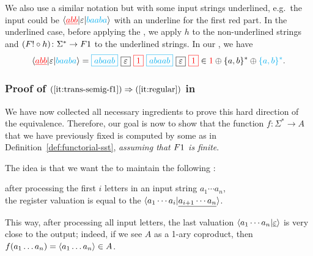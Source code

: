 We also use a similar notation but with some input strings underlined, e.g.~the input could be $\langle {\color{red}\underline{abb}} | \varepsilon | {\color{cyan}baaba} \rangle$ with an underline for the first red part. In the underlined case, before applying the , we apply $h$ to the non-underlined strings and
$(\functor! \circ h) \colon \Sigma^* \to \functor1$
to the underlined strings. In our , we have
\begin{align*}
  \tuple{\red{\underline{abb}} | \varepsilon | \blue{baaba}} =  
  \blue{\boxed{abaab}} \ 
  \boxed{\varepsilon} \ 
  \red{\boxed{1}} \ 
  \blue{\boxed{abaab}} \
  \boxed{\varepsilon} \
  \red{\boxed{1}}
  \in \red{1} \oplus \set{a,b}^*  \oplus \blue{\set{a,b}^*}.
\end{align*}

\subsubsection{Proof of $(\ref{it:trans-semig-f1}) \Rightarrow (\ref{it:regular})$ in }
We have now collected all necessary ingredients to prove this hard direction of
the equivalence. Therefore, our goal is now to show that the function $f\colon
\Sigma^* \to A$ that we have previously fixed is computed by some  as in Definition~\ref{def:functorial-sst},
\emph{assuming that $\functor 1$ is finite}.

The idea is that we want the \functorialsst to maintain the following : 
\begin{center}
  after processing the first $i$ letters in an input string $a_1 \cdots a_n$,\\ the register valuation is equal to the \kl{factorized output} $\langle a_1 \cdots a_i | \underline{a_{i+1} \cdots a_n} \rangle$.
\end{center}
 This way, after processing all input letters, the last valuation $\langle a_1 \cdots a_n | \underline{\varepsilon} \rangle$ is very close to the output; indeed, if we see $A$ as a 1-ary coproduct, then $f(a_1\dots a_n) = \langle a_1 \dots a_n \rangle \in A$.

